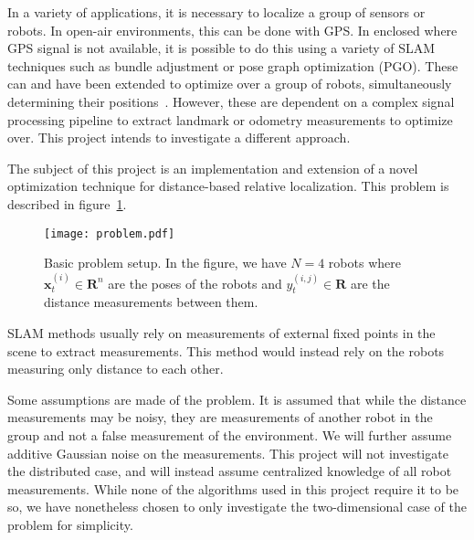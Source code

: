 In a variety of applications, it is necessary to localize a group of sensors or robots. In open-air environments, this can be done with GPS. In enclosed where GPS signal is not available, it is possible to do this using a variety of SLAM techniques such as bundle adjustment or pose graph optimization (PGO). These can and have been extended to optimize over a group of robots, simultaneously determining their positions~\cite{SLAM_distributed}. However, these are dependent on a complex signal processing pipeline to extract landmark or odometry measurements to optimize over. This project intends to investigate a different approach. 

The subject of this project is an implementation and extension of a novel optimization technique for distance-based relative localization. This problem is described in figure~\ref{fig:problem_desc}.
\begin{figure}[ht]
    \centering
    \texttt{[image: problem.pdf]}
    \caption{Basic problem setup. In the figure, we have $N=4$ robots where $\mathbf{x}^{(i)}_t \in \mathbf{R}^n$ are the poses of the robots and $y^{(i,j)}_t \in \mathbf{R}$ are the distance measurements between them.}
    \label{fig:problem_desc}
\end{figure}

SLAM  methods usually rely on measurements of external fixed points in the scene to extract measurements. This method would instead rely on the robots measuring only distance to each other. 

Some assumptions are made of the problem. It is assumed that while the distance measurements may be noisy, they are measurements of another robot in the group and not a false measurement of the environment. We will further assume additive Gaussian noise on the measurements. This project will not investigate the distributed case, and will instead assume centralized knowledge of all robot measurements. While none of the algorithms used in this project require it to be so, we have nonetheless chosen to only investigate the two-dimensional case of the problem for simplicity. 